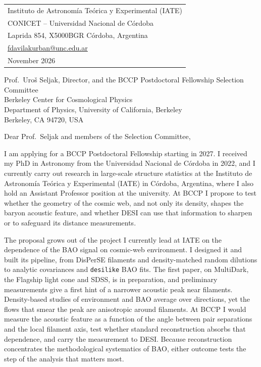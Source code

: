\documentclass[11pt,a4paper]{article}
\begin{document}
\hfill\begin{tabular}{l}
Instituto de Astronom\'ia Te\'orica y Experimental (IATE)\\
CONICET -- Universidad Nacional de C\'ordoba\\
Laprida 854, X5000BGR C\'ordoba, Argentina\\
\href{mailto:fdavilakurban@unc.edu.ar}{fdavilakurban@unc.edu.ar}\\[8pt]
November 2026
\end{tabular}

\vspace{4pt}
Prof.~Uro\v{s} Seljak, Director, and the BCCP Postdoctoral Fellowship Selection Committee\\
Berkeley Center for Cosmological Physics\\
Department of Physics, University of California, Berkeley\\
Berkeley, CA 94720, USA

\vspace{6pt}
Dear Prof.~Seljak and members of the Selection Committee,

I am applying for a BCCP Postdoctoral Fellowship starting in 2027. I received my PhD in Astronomy from the Universidad Nacional de C\'ordoba in 2022, and I currently carry out research in large-scale structure statistics at the Instituto de Astronom\'ia Te\'orica y Experimental (IATE) in C\'ordoba, Argentina, where I also hold an Assistant Professor position at the university. At BCCP I propose to test whether the geometry of the cosmic web, and not only its density, shapes the baryon acoustic feature, and whether DESI can use that information to sharpen or to safeguard its distance measurements.

The proposal grows out of the project I currently lead at IATE on the dependence of the BAO signal on cosmic-web environment. I designed it and built its pipeline, from DisPerSE filaments and density-matched random dilutions to analytic covariances and \texttt{desilike} BAO fits. The first paper, on MultiDark, the Flagship light cone and SDSS, is in preparation, and preliminary measurements give a first hint of a narrower acoustic peak near filaments. Density-based studies of environment and BAO average over directions, yet the flows that smear the peak are anisotropic around filaments. At BCCP I would measure the acoustic feature as a function of the angle between pair separations and the local filament axis, test whether standard reconstruction absorbs that dependence, and carry the measurement to DESI. Because reconstruction concentrates the methodological systematics of BAO, either outcome tests the step of the analysis that matters most.
\end{document}
